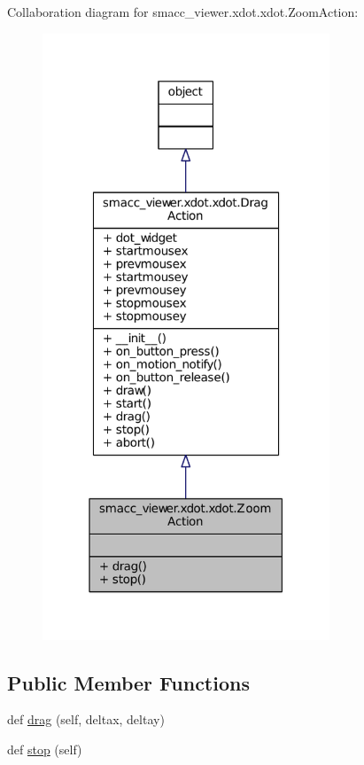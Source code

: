 Collaboration diagram for smacc\+\_\+viewer.\+xdot.\+xdot.\+Zoom\+Action\+:
\nopagebreak
\begin{figure}[H]
\begin{center}
\leavevmode
\includegraphics[width=243pt]{classsmacc__viewer_1_1xdot_1_1xdot_1_1ZoomAction__coll__graph}
\end{center}
\end{figure}
\subsection*{Public Member Functions}
\begin{DoxyCompactItemize}
\item 
def \hyperlink{classsmacc__viewer_1_1xdot_1_1xdot_1_1ZoomAction_a9ff24da19187731ae9996b22d6f81ebb}{drag} (self, deltax, deltay)
\item 
def \hyperlink{classsmacc__viewer_1_1xdot_1_1xdot_1_1ZoomAction_ae8f863f515a62087826c68af1a81ae29}{stop} (self)
\end{DoxyCompactItemize}
